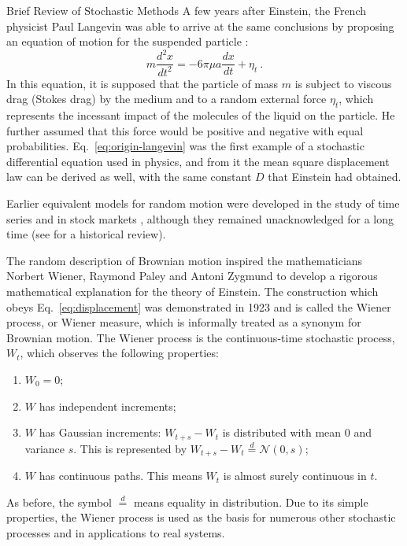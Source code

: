 \begin{chapter}{Brief Review of Stochastic Methods}
A few years after Einstein,
the French physicist Paul Langevin was able to arrive at the same conclusions
by proposing an equation of motion for the suspended particle
\parencite{langevin1908theorie}:
\begin{equation} \label{eq:origin-langevin}
    m \frac{d^2 x}{dt^2} = - 6 \pi \mu a \frac{dx}{dt} + \eta_t \ .
\end{equation}
In this equation, it is supposed that the particle of mass $m$
is subject to
viscous drag (Stokes drag) by the medium
and to a random external force $\eta_t$, which represents the
incessant impact of the molecules of the liquid on the particle.
He further assumed that this force would be positive and negative
with equal probabilities.
Eq.~\eqref{eq:origin-langevin} was the first example of a stochastic differential equation
used in physics,
and from it
the mean square displacement law can be derived as well,
with the same constant $D$ that Einstein had obtained.

Earlier equivalent models for random motion were developed
in the study of time series \parencite{thiele1880} and in stock
markets \parencite{bachelier1900}, although they remained unacknowledged
for a long time (see \textcite{jarrow2004} for a historical review).

The random description of Brownian motion inspired the mathematicians
Norbert Wiener, Raymond Paley and Antoni Zygmund
to develop a rigorous mathematical
explanation for the theory of Einstein.
The construction which obeys Eq.~\eqref{eq:displacement}
was demonstrated in 1923 and is called the
Wiener process, or Wiener measure,
which is informally treated as a synonym for Brownian motion.
The Wiener process is the continuous-time stochastic process, $W_t$,
which observes the following properties:
\begin{enumerate}
    \item $W_0 = 0$;
    \item $W$ has independent increments;
    \item $W$ has Gaussian increments: $W_{t+s} - W_t$ is distributed with mean $0$
    and variance $s$. This is represented by $W_{t+s} - W_t \overset{d}{=} \mathcal{N}(0,s)$;
    \item $W$ has continuous paths. This means $W_t$ is almost surely continuous in $t$.
\end{enumerate}
As before, the symbol $\overset{d}{=}$ means equality in distribution.
Due to its simple properties, the Wiener process
is used as the basis for numerous other stochastic processes and
in applications to real systems.


\end{chapter}
